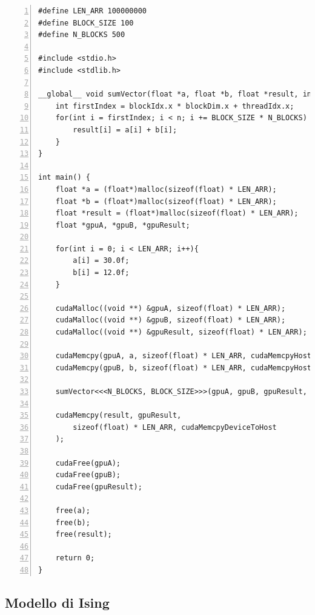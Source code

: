 \documentclass[a4paper,11pt]{article}
\begin{document}
\begin{Verbatim}[numbers=left, frame=single]
#define LEN_ARR 100000000
#define BLOCK_SIZE 100
#define N_BLOCKS 500

#include <stdio.h>
#include <stdlib.h>

__global__ void sumVector(float *a, float *b, float *result, int n) {
    int firstIndex = blockIdx.x * blockDim.x + threadIdx.x;
    for(int i = firstIndex; i < n; i += BLOCK_SIZE * N_BLOCKS) {
        result[i] = a[i] + b[i];
    }
}

int main() {
    float *a = (float*)malloc(sizeof(float) * LEN_ARR);
    float *b = (float*)malloc(sizeof(float) * LEN_ARR);
    float *result = (float*)malloc(sizeof(float) * LEN_ARR);
    float *gpuA, *gpuB, *gpuResult;

    for(int i = 0; i < LEN_ARR; i++){
        a[i] = 30.0f;
        b[i] = 12.0f;
    }

    cudaMalloc((void **) &gpuA, sizeof(float) * LEN_ARR);
    cudaMalloc((void **) &gpuB, sizeof(float) * LEN_ARR);
    cudaMalloc((void **) &gpuResult, sizeof(float) * LEN_ARR);

    cudaMemcpy(gpuA, a, sizeof(float) * LEN_ARR, cudaMemcpyHostToDevice);
    cudaMemcpy(gpuB, b, sizeof(float) * LEN_ARR, cudaMemcpyHostToDevice);

    sumVector<<<N_BLOCKS, BLOCK_SIZE>>>(gpuA, gpuB, gpuResult, LEN_ARR);

    cudaMemcpy(result, gpuResult,
        sizeof(float) * LEN_ARR, cudaMemcpyDeviceToHost
    );

    cudaFree(gpuA);
    cudaFree(gpuB);
    cudaFree(gpuResult);

    free(a); 
    free(b); 
    free(result);

    return 0;
}
\end{Verbatim}



\subsection{Modello di Ising}
\end{document}
